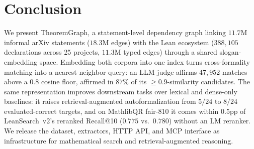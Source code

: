 \section{Conclusion}
We present TheoremGraph, a statement-level dependency graph linking $11.7$M informal arXiv statements ($18.3$M edges) with the Lean ecosystem ($388{,}105$ declarations across 25 projects, $11.3$M typed edges) through a shared slogan-embedding space. Embedding both corpora into one index turns cross-formality matching into a nearest-neighbor query: an LLM judge affirms $47{,}952$ matches above a $0.8$ cosine floor,  affirmed in $87\%$ of its $\geq\!0.9$-similarity candidates. The same representation improves downstream tasks over lexical and dense-only baselines: it raises retrieval-augmented autoformalization from $5/24$ to $8/24$ evaluated-correct targets, and on MathlibQR fair-810 it comes within 0.5pp of LeanSearch~v2's reranked Recall@10 ($0.775$ vs.\ $0.780$) without an LM reranker. We release the dataset, extractors, HTTP API, and MCP interface as infrastructure for mathematical search and retrieval-augmented reasoning.
